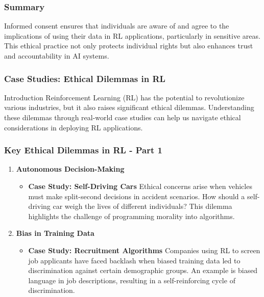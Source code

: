 \documentclass[aspectratio=169]{beamer}
\begin{document}
\begin{frame}[fragile]
    \frametitle{Summary}
    \begin{block}{}
        Informed consent ensures that individuals are aware of and agree to the implications of using their data in RL applications, particularly in sensitive areas. This ethical practice not only protects individual rights but also enhances trust and accountability in AI systems.
    \end{block}
\end{frame}

\begin{frame}[fragile]
    \frametitle{Case Studies: Ethical Dilemmas in RL}
    \begin{block}{Introduction}
        Reinforcement Learning (RL) has the potential to revolutionize various industries, but it also raises significant ethical dilemmas. Understanding these dilemmas through real-world case studies can help us navigate ethical considerations in deploying RL applications.
    \end{block}
\end{frame}

\begin{frame}[fragile]
    \frametitle{Key Ethical Dilemmas in RL - Part 1}
    \begin{enumerate}
        \item \textbf{Autonomous Decision-Making}  
            \begin{itemize}
                \item \textbf{Case Study: Self-Driving Cars}  
                Ethical concerns arise when vehicles must make split-second decisions in accident scenarios. 
                How should a self-driving car weigh the lives of different individuals? This dilemma highlights the challenge of programming morality into algorithms.
            \end{itemize}
        \item \textbf{Bias in Training Data}  
            \begin{itemize}
                \item \textbf{Case Study: Recruitment Algorithms}  
                Companies using RL to screen job applicants have faced backlash when biased training data led to discrimination against certain demographic groups. 
                An example is biased language in job descriptions, resulting in a self-reinforcing cycle of discrimination.
            \end{itemize}
    \end{enumerate}
\end{frame}
\end{document}
